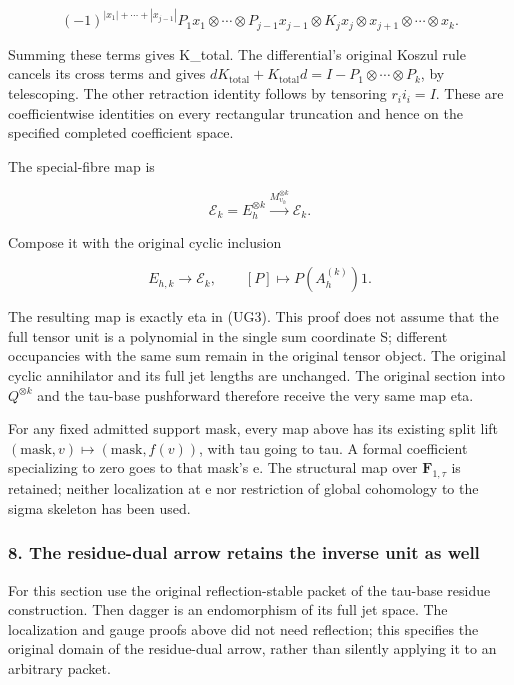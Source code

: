 \[
(-1)^{|x_1|+\cdots+|x_{j-1}|}
P_1x_1\otimes\cdots\otimes P_{j-1}x_{j-1}
\otimes K_jx_j\otimes x_{j+1}\otimes\cdots\otimes x_k.
\]

Summing these terms gives K\_total. The differential's original Koszul rule cancels its cross terms and gives \(d K_{\mathrm{total}}+K_{\mathrm{total}}d=I-P_1\otimes\cdots\otimes P_k\), by telescoping. The other retraction identity follows by tensoring \(r_i i_i=I\). These are coefficientwise identities on every rectangular truncation and hence on the specified completed coefficient space.

The special-fibre map is

\[
\mathcal E_k=E_h^{\otimes k}
\xrightarrow{M_{\upsilon_h}^{\otimes k}}\mathcal E_k.
\tag{UG18}
\]

Compose it with the original cyclic inclusion

\[
E_{h,k}\longrightarrow\mathcal E_k,
\qquad[P]\longmapsto P(A_h^{(k)})1.
\]

The resulting map is exactly eta in (UG3). This proof does not assume that the full tensor unit is a polynomial in the single sum coordinate S; different occupancies with the same sum remain in the original tensor object. The original cyclic annihilator and its full jet lengths are unchanged. The original section into \(Q^{\otimes k}\) and the tau-base pushforward therefore receive the very same map eta.

For any fixed admitted support mask, every map above has its existing split lift \((\mathrm{mask},v)\mapsto(\mathrm{mask},f(v))\), with tau going to tau. A formal coefficient specializing to zero goes to that mask's e. The structural map over \(\mathbf F_{1,\tau}\) is retained; neither localization at e nor restriction of global cohomology to the sigma skeleton has been used.

\subsubsection{8. The residue-dual arrow retains the inverse unit as well}\label{endpoint-f1_unit_gauge--the-residue-dual-arrow-retains-the-inverse-unit-as-well}

For this section use the original reflection-stable packet of the tau-base residue construction. Then dagger is an endomorphism of its full jet space. The localization and gauge proofs above did not need reflection; this specifies the original domain of the residue-dual arrow, rather than silently applying it to an arbitrary packet.

